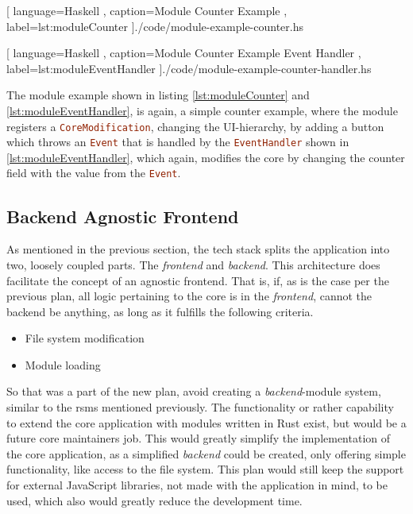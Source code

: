 \begin{center}
  
    [ language=Haskell
    , caption={Module Counter Example}
    , label=lst:moduleCounter
    ]{./code/module-example-counter.hs}
\end{center}

\begin{center}
  
    [ language=Haskell
    , caption={Module Counter Example Event Handler}
    , label=lst:moduleEventHandler
    ]{./code/module-example-counter-handler.hs}
\end{center}

The module example shown in listing \ref{lst:moduleCounter} and
\ref{lst:moduleEventHandler}, is again, a simple counter example, where the
module registers a \lstinline[language=Haskell]{CoreModification}, changing the
UI-hierarchy, by adding a button which throws an
\lstinline[language=Haskell]{Event} that is handled by the
\lstinline[language=Haskell]{EventHandler} shown in
\ref{lst:moduleEventHandler}, which again, modifies the core by changing the
counter field with the value from the \lstinline[language=Haskell]{Event}.

\subsection{Backend Agnostic Frontend}

As mentioned in the previous section, the tech stack splits the application into
two, loosely coupled parts. The \textit{frontend} and \textit{backend}. This
architecture does facilitate the concept of an agnostic frontend. That is, if,
as is the case per the previous plan, all logic pertaining to the core is in the
\textit{frontend}, cannot the backend be anything, as long as it fulfills the
following criteria.

\begin{itemize}
  \item File system modification
  \item Module loading
\end{itemize}

So that was a part of the new plan, avoid creating a \textit{backend}-module
system, similar to the \gls{rsms} mentioned previously. The functionality or
rather capability to extend the core application with modules written in Rust
exist, but would be a future core maintainers job. This would greatly simplify
the implementation of the core application, as a simplified \textit{backend}
could be created, only offering simple functionality, like access to the file
system. This plan would still keep the support for external JavaScript
libraries, not made with the application in mind, to be used, which also would
greatly reduce the development time.

